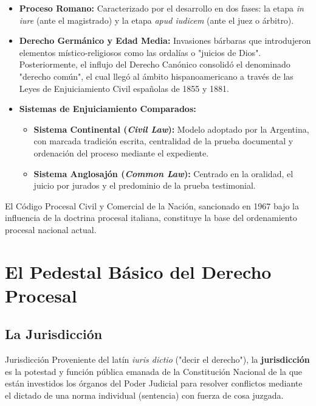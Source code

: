 \documentclass[12pt,oneside]{book}
\begin{document}
\begin{itemize}
    \item \textbf{Proceso Romano:} Caracterizado por el desarrollo en dos fases: la etapa \textit{in iure} (ante el magistrado) y la etapa \textit{apud iudicem} (ante el juez o árbitro).
    \item \textbf{Derecho Germánico y Edad Media:} Invasiones bárbaras que introdujeron elementos místico-religiosos como las ordalías o "juicios de Dios". Posteriormente, el influjo del Derecho Canónico consolidó el denominado "derecho común", el cual llegó al ámbito hispanoamericano a través de las Leyes de Enjuiciamiento Civil españolas de 1855 y 1881.
    \item \textbf{Sistemas de Enjuiciamiento Comparados:}
    \begin{itemize}
        \item \textbf{Sistema Continental (\textit{Civil Law}):} Modelo adoptado por la Argentina, con marcada tradición escrita, centralidad de la prueba documental y ordenación del proceso mediante el expediente.
        \item \textbf{Sistema Anglosajón (\textit{Common Law}):} Centrado en la oralidad, el juicio por jurados y el predominio de la prueba testimonial.
    \end{itemize}
\end{itemize}

El Código Procesal Civil y Comercial de la Nación, sancionado en 1967 bajo la influencia de la doctrina procesal italiana, constituye la base del ordenamiento procesal nacional actual.

\chapter{El Pedestal Básico del Derecho Procesal}

\section{La Jurisdicción}

\begin{definition}{Jurisdicción}
Proveniente del latín \textit{iuris dictio} ("decir el derecho"), la \textbf{jurisdicción} es la potestad y función pública emanada de la Constitución Nacional de la que están investidos los órganos del Poder Judicial para resolver conflictos mediante el dictado de una norma individual (sentencia) con fuerza de cosa juzgada.
\end{definition}
\end{document}

